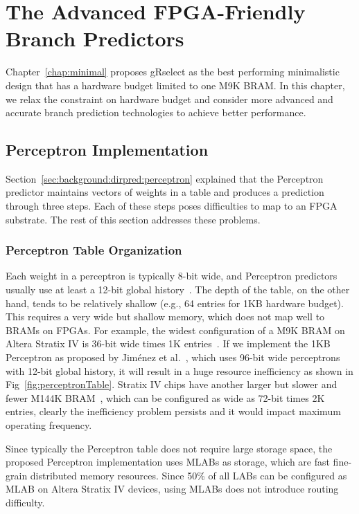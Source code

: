\chapter{The Advanced FPGA-Friendly Branch Predictors}
\label{chap:advanced}

Chapter~\ref{chap:minimal} proposes gRselect as the best performing minimalistic design that has a hardware budget limited to one M9K BRAM. In this chapter, we relax the constraint on hardware budget and consider more advanced and accurate branch prediction technologies to achieve better performance.

\section{Perceptron Implementation}
\label{sec:advanced:perceptron}
Section~\ref{sec:background:dirpred:perceptron} explained that the Perceptron predictor maintains vectors of weights in a table and produces a prediction through three steps. Each of these steps poses difficulties to map to an FPGA substrate. The rest of this section addresses these problems.

\subsection{Perceptron Table Organization}
\label{sec:advanced:perceptron:table}
Each weight in a perceptron is typically 8-bit wide, and Perceptron predictors usually use at least a 12-bit global history~\cite{perceptron}. The depth of the table, on the other hand, tends to be relatively shallow (e.g., 64 entries for 1KB hardware budget). This requires a very wide but shallow memory, which does not map well to BRAMs on FPGAs. For example, the widest configuration of a M9K BRAM on Altera Stratix IV is 36-bit wide times 1K entries~\cite{StratixIVM9K}. If we implement the 1KB Perceptron as proposed by Jim\'enez et al.~\cite{perceptron}, which uses 96-bit wide perceptrons with 12-bit global history, it will result in a huge resource inefficiency as shown in Fig~\ref{fig:perceptronTable}. Stratix IV chips have another larger but slower and fewer M144K BRAM~\cite{StratixIVM9K}, which can be configured as wide as 72-bit times 2K entries, clearly the inefficiency problem persists and it would impact maximum operating frequency.

Since typically the Perceptron table does not require large storage space, the proposed Perceptron implementation uses MLABs as storage, which are fast fine-grain distributed memory resources. Since 50\% of all LABs can be configured as MLAB on Altera Stratix IV devices, using MLABs does not introduce routing difficulty.


